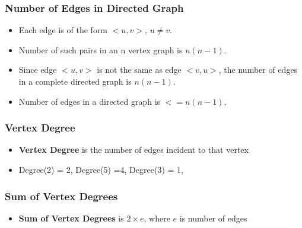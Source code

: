 \documentclass[newPxFont,sthlmFooter,nooffset]{beamer}
\begin{document}
\begin{frame}[t]
  \frametitle{Number of Edges in Directed Graph}
  \begin{itemize}
  \item Each edge is of the form $<u,v>$, $u \neq v$.
  \item Number of such pairs in an n vertex graph is $n(n-1)$.
  \item Since edge $<u,v>$ is not the same as edge $<v,u>$, the
number of edges in a complete directed graph is $n(n-1)$.
\item Number of edges in a directed graph is $<= n(n-1)$.
  \end{itemize}
\end{frame}


\begin{frame}[t]
  \frametitle{Vertex Degree}
  \begin{itemize}
  \item \textbf{Vertex Degree} is the number of edges incident to that vertex
  \item Degree(2) = 2, Degree(5) =4, Degree(3) = 1, 
  \end{itemize}
  \begin{center}
  \end{center}

\end{frame}

\begin{frame}[t]
  \frametitle{Sum of Vertex Degrees}
  \begin{itemize}
  \item \textbf{Sum of Vertex Degrees} is $2\times e$, where $e$ is number of edges
  \end{itemize}
  \begin{center}
  \end{center}

\end{frame}
\end{document}
